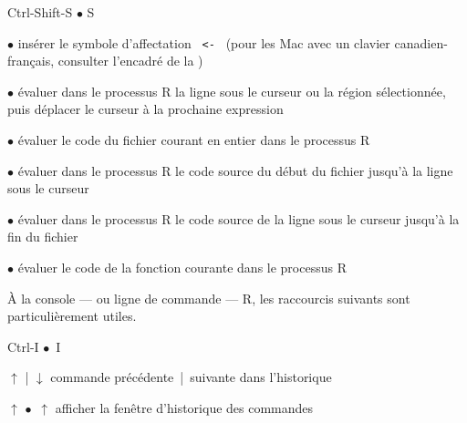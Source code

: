 \begin{ttscript}{Ctrl-Shift-S $\bullet$ \cmdkey\shiftkey S}
\item[\code{Alt+-} $\bullet$ \code{\optkey\,-}] insérer le symbole
  d'affectation \verb*| <- | (pour les Mac avec un clavier
  canadien-français, consulter l'encadré de la
  )
\item[\code{Ctrl+Retour} $\bullet$ \code{\cmdkey\,\returnkey}]
  évaluer dans le processus R la ligne sous le curseur ou la région
  sélectionnée, puis déplacer le curseur à la prochaine expression
\item[\code{Ctrl+Shift+S} $\bullet$ \code{\shiftkey\,\cmdkey\,S}]
  évaluer le code du fichier courant en entier dans le processus R
\item[\code{Ctrl+Alt+B} $\bullet$ \code{\optkey\,\cmdkey\,B}]
  évaluer dans le processus R le code source du début du fichier
  jusqu'à la ligne sous le curseur
\item[\code{Ctrl+Alt+E} $\bullet$ \code{\optkey\,\cmdkey\,E}]
  évaluer dans le processus R le code source de la ligne sous le curseur
  jusqu'à la fin du fichier
\item[\code{Ctrl+Alt+F} $\bullet$ \code{\optkey\,\cmdkey\,F}]
  évaluer le code de la fonction courante dans le processus R
\end{ttscript}

À la console --- ou ligne de commande --- R, les raccourcis suivants
sont particulièrement utiles.
\begin{ttscript}{Ctrl-I $\bullet$ \cmdkey\,I}
\item[$\uparrow$ | $\downarrow$] commande
  précédente~|~suivante dans l'historique
\item[\code{Ctrl+}$\uparrow$ $\bullet$ \cmdkey\,$\uparrow$] afficher
  la fenêtre d'historique des commandes
\end{ttscript}

